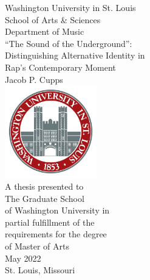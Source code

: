 \begin{titlepage}
    \begin{center}
        \small Washington University in St. Louis \\
        School of Arts \& Sciences \\
        Department of Music \\
        \vspace*{1.25in}
        \Large ``The Sound of the Underground'': \\
        \vspace{0.1cm}
        \large Distinguishing Alternative Identity in \\ 
        Rap's Contemporary Moment  \\
        \vspace{0.5cm}
        \normalsize Jacob P. Cupps \\
        \vfill
        \includegraphics[width=0.3\textwidth]{images/misc/header_logo.png} \\
        \vspace{0.8cm}
        \small A thesis presented to \\ The Graduate School \\ of Washington University in \\ partial fulfillment of the \\ requirements for the degree \\ of Master of Arts \\
        \vspace{0.8cm}
        \normalsize May 2022 \\
        St. Louis, Missouri
    \end{center}
\end{titlepage}